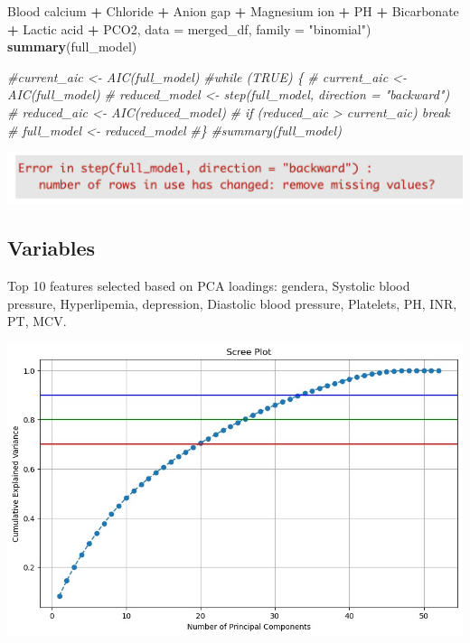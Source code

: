 \documentclass[
]{article}
\newenvironment{Shaded}{\begin{snugshade}}{\end{snugshade}}
\newcommand{\AttributeTok}[1]{\textcolor[rgb]{0.13,0.29,0.53}{#1}}
\newcommand{\CommentTok}[1]{\textcolor[rgb]{0.56,0.35,0.01}{\textit{#1}}}
\newcommand{\FunctionTok}[1]{\textcolor[rgb]{0.13,0.29,0.53}{\textbf{#1}}}
\newcommand{\NormalTok}[1]{#1}
\newcommand{\SpecialCharTok}[1]{\textcolor[rgb]{0.81,0.36,0.00}{\textbf{#1}}}
\newcommand{\StringTok}[1]{\textcolor[rgb]{0.31,0.60,0.02}{#1}}
\begin{document}
\begin{Shaded}
\begin{Highlighting}[]
              \StringTok{\textasciigrave{}}\AttributeTok{Blood calcium}\StringTok{\textasciigrave{}} \SpecialCharTok{+}\NormalTok{  Chloride }\SpecialCharTok{+} \StringTok{\textasciigrave{}}\AttributeTok{Anion gap}\StringTok{\textasciigrave{}} \SpecialCharTok{+} \StringTok{\textasciigrave{}}\AttributeTok{Magnesium ion}\StringTok{\textasciigrave{}} \SpecialCharTok{+}\NormalTok{ PH }
            \SpecialCharTok{+}\NormalTok{ Bicarbonate }\SpecialCharTok{+} \StringTok{\textasciigrave{}}\AttributeTok{Lactic acid}\StringTok{\textasciigrave{}} \SpecialCharTok{+}\NormalTok{ PCO2, }
            \AttributeTok{data =}\NormalTok{ merged\_df, }\AttributeTok{family =} \StringTok{"binomial"}\NormalTok{)}
\FunctionTok{summary}\NormalTok{(full\_model)}
\end{Highlighting}
\end{Shaded}

\begin{Shaded}
\begin{Highlighting}[]
\CommentTok{\#current\_aic \textless{}{-} AIC(full\_model)}
\CommentTok{\#while (TRUE) \{}
\CommentTok{\#    current\_aic \textless{}{-} AIC(full\_model)}
\CommentTok{\#    reduced\_model \textless{}{-} step(full\_model, direction = "backward")}
\CommentTok{\#    reduced\_aic \textless{}{-} AIC(reduced\_model)}
\CommentTok{\#    if (reduced\_aic \textgreater{} current\_aic) break}
\CommentTok{\#    full\_model \textless{}{-} reduced\_model}
\CommentTok{\#\}}
\CommentTok{\#summary(full\_model)}
\end{Highlighting}
\end{Shaded}

\includegraphics{error1.png}

\subsection{Variables}\label{variables}

Top 10 features selected based on PCA loadings: gendera, Systolic blood
pressure, Hyperlipemia, depression, Diastolic blood pressure, Platelets,
PH, INR, PT, MCV.

\includegraphics{PCA.jpeg}
\end{document}

